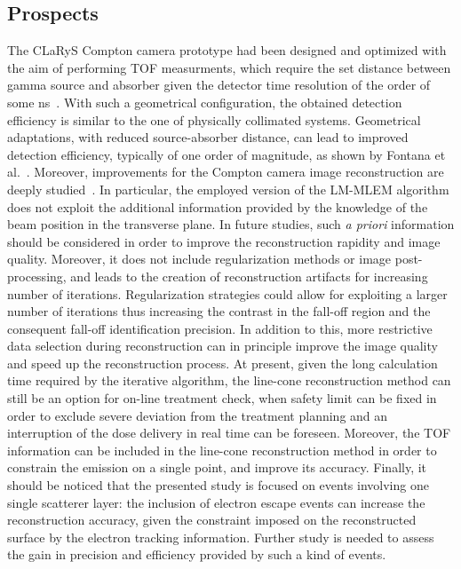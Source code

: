\subsection{Prospects}
The CLaRyS Compton camera prototype had been designed and optimized with the aim of performing TOF measurments, which require the set distance between gamma source and absorber given the detector time resolution of the order of some ns~\cite{Roellinghoff2011}. With such a geometrical configuration, the obtained detection efficiency is similar to the one of physically collimated systems. Geometrical adaptations, with reduced source-absorber distance, can lead to improved detection efficiency, typically of one order of magnitude, as shown by Fontana et al.~\cite{Fontana2017}. 
Moreover, improvements for the Compton camera image reconstruction are deeply studied~\cite{Andreyev2016, Schone2017, Taya2017, Huang2018}. In particular, the employed version of the LM-MLEM algorithm does not exploit the additional information provided by the knowledge of the beam position in the transverse plane. In future studies, such \textit{a priori} information should be considered in order to improve the reconstruction rapidity and image quality. Moreover, it does not include regularization methods or image post-processing, and leads to the creation of reconstruction artifacts for increasing number of iterations. Regularization strategies could allow for exploiting a larger number of iterations thus increasing the contrast in the fall-off region and the consequent fall-off identification precision. In addition to this, more restrictive data selection during reconstruction can in principle improve the image quality and speed up the reconstruction process. At present, given the long calculation time required by the iterative algorithm, the line-cone reconstruction method can still be an option for on-line treatment check, when safety limit can be fixed in order to exclude severe deviation from the treatment planning and an interruption of the dose delivery in real time can be foreseen. Moreover, the TOF information can be included in the line-cone reconstruction method in order to constrain the emission on a single point, and improve its accuracy.
Finally, it should be noticed that the presented study is focused on events involving one single scatterer layer: the inclusion of electron escape events can increase the reconstruction accuracy, given the constraint imposed on the reconstructed surface by the electron tracking information. Further study is needed to assess the gain in precision and efficiency provided by such a kind of events. 

